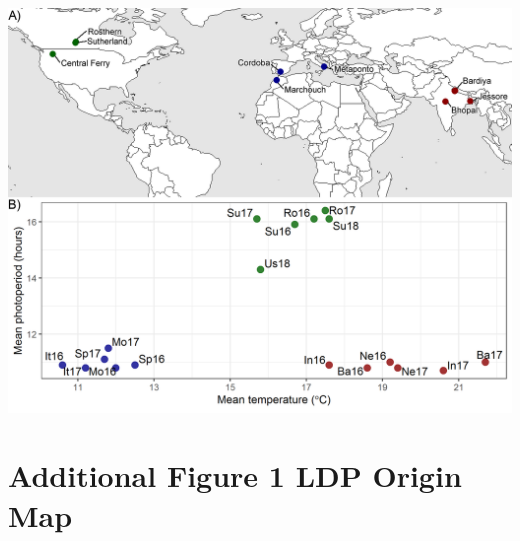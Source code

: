 \documentclass[
]{article}
\begin{document}
\includegraphics[width=1\linewidth]{Phenology_Vignette_files/figure-latex/unnamed-chunk-4-1}

\hypertarget{additional-figure-1-ldp-origin-map}{%
\section{Additional Figure 1 LDP Origin
Map}\label{additional-figure-1-ldp-origin-map}}
\end{document}
